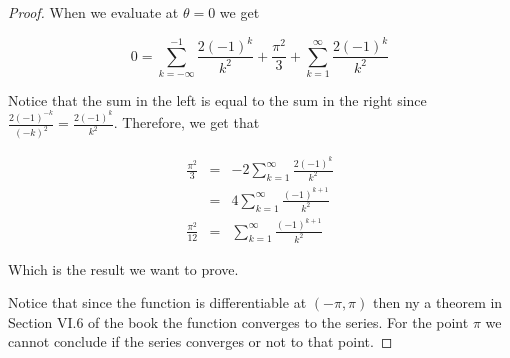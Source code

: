\documentclass[letterpaper,twoside,11pt]{article}
\begin{document}
\begin{proof}
When we evaluate at $\theta = 0$ we get 

\begin{equation}
0=\sum_{k=-\infty}^{-1} \frac{2(-1)^k}{k^{2}}+\frac{\pi^{2}}{3}+ \sum_{k=1}^{\infty} \frac{2(-1)^k}{k^{2}}\nonumber
\end{equation}

Notice that the sum in the left is equal to the sum in the right since $\frac{2(-1)^{-k}}{(-k)^{2}}=\frac{2(-1)^k}{k^{2}}$. Therefore, we get that 

\begin{eqnarray}
\frac{\pi^{2}}{3}&=&-2\sum_{k=1}^{\infty} \frac{2(-1)^k}{k^{2}}\nonumber
\\&=&4\sum_{k=1}^{\infty} \frac{(-1)^{k+1}}{k^{2}} \nonumber
\\\frac{\pi^{2}}{12}&=&\sum_{k=1}^{\infty} \frac{(-1)^{k+1}}{k^{2}} \nonumber
\end{eqnarray}

Which is the result we want to prove.

Notice that since the function is differentiable at $(-\pi,\pi)$ then ny a theorem in Section VI.6 of the book the function converges to the series. For the point $\pi$ we cannot conclude if the series converges or not to that point. 
\end{proof}
\end{document}
